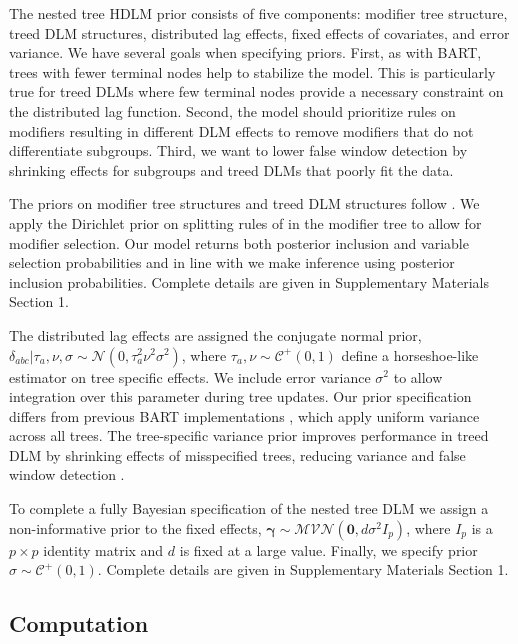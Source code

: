 \documentclass[12pt]{article}
\begin{document}
The nested tree HDLM prior consists of five components: modifier tree structure, treed DLM structures, distributed lag effects, fixed effects of covariates, and error variance. We have several goals when specifying priors. First, as with BART, trees with fewer terminal nodes help to stabilize the model. This is particularly true for treed DLMs where few terminal nodes provide a necessary constraint on the distributed lag function. Second, the model should prioritize rules on modifiers resulting in different DLM effects to remove modifiers that do not differentiate subgroups. Third, we want to lower false window detection by shrinking effects for subgroups and treed DLMs that poorly fit the data.

The priors on modifier tree structures and treed DLM structures follow \citet{Chipman2012}. We apply the Dirichlet prior on splitting rules of \citet{Linero2018b} in the modifier tree to allow for modifier selection. Our model returns both posterior inclusion and variable selection probabilities and in line with \citet{Linero2018b} we make inference using posterior inclusion probabilities. Complete details are given in Supplementary Materials Section 1.

The distributed lag effects are assigned the conjugate normal prior, $\delta_{abc} |\tau_a, \nu, \sigma \sim\mathcal{N}(0,\tau_a^2\nu^2\sigma^2)$,
where $\tau_a,\nu\sim\mathcal{C}^+(0,1)$ define a horseshoe-like estimator on tree specific effects. We include error variance $\sigma^2$ to allow integration over this parameter during tree updates. Our prior specification differs from previous BART implementations \citep{Chipman2012,Starling2019}, which apply uniform variance across all trees. The tree-specific variance prior improves performance in treed DLM by shrinking effects of misspecified trees, reducing variance and false window detection \citep{Mork2022EstimatingPairs}. 

To complete a fully Bayesian specification of the nested tree DLM we assign a non-informative prior to the fixed effects, $\boldsymbol\gamma\sim\mathcal{MVN}(\mathbf{0},d\sigma^2 I_p)$, where $I_p$ is a $p\times p$ identity matrix and $d$ is fixed at a large value. Finally, we specify prior $\sigma\sim\mathcal{C}^+(0,1)$. Complete details are given in Supplementary Materials Section 1.




\subsection{Computation}
\end{document}
